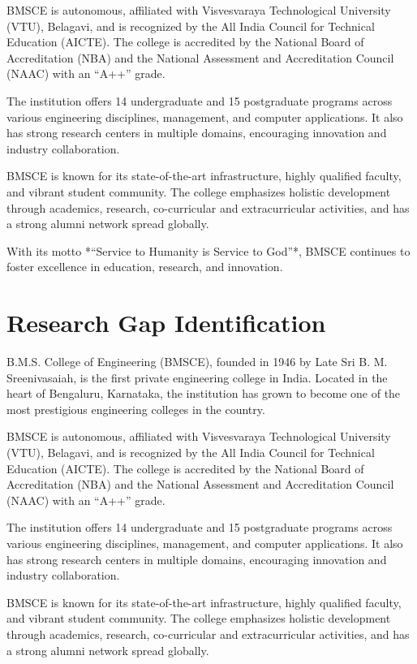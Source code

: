 \documentclass[12pt,a4paper]{report}
\begin{document}
BMSCE is autonomous, affiliated with Visvesvaraya Technological University (VTU), Belagavi, 
and is recognized by the All India Council for Technical Education (AICTE). The college is 
accredited by the National Board of Accreditation (NBA) and the National Assessment and 
Accreditation Council (NAAC) with an “A++” grade.

The institution offers 14 undergraduate and 15 postgraduate programs across various 
engineering disciplines, management, and computer applications. It also has strong research 
centers in multiple domains, encouraging innovation and industry collaboration. 

BMSCE is known for its state-of-the-art infrastructure, highly qualified faculty, and vibrant 
student community. The college emphasizes holistic development through academics, research, 
co-curricular and extracurricular activities, and has a strong alumni network spread 
globally. 

With its motto *“Service to Humanity is Service to God”*, BMSCE continues to foster 
excellence in education, research, and innovation.
\section{Research Gap Identification}
B.M.S. College of Engineering (BMSCE), founded in 1946 by Late Sri B. M. Sreenivasaiah, 
is the first private engineering college in India. Located in the heart of Bengaluru, 
Karnataka, the institution has grown to become one of the most prestigious engineering 
colleges in the country. 

BMSCE is autonomous, affiliated with Visvesvaraya Technological University (VTU), Belagavi, 
and is recognized by the All India Council for Technical Education (AICTE). The college is 
accredited by the National Board of Accreditation (NBA) and the National Assessment and 
Accreditation Council (NAAC) with an “A++” grade.

The institution offers 14 undergraduate and 15 postgraduate programs across various 
engineering disciplines, management, and computer applications. It also has strong research 
centers in multiple domains, encouraging innovation and industry collaboration. 

BMSCE is known for its state-of-the-art infrastructure, highly qualified faculty, and vibrant 
student community. The college emphasizes holistic development through academics, research, 
co-curricular and extracurricular activities, and has a strong alumni network spread 
globally. 
\end{document}

